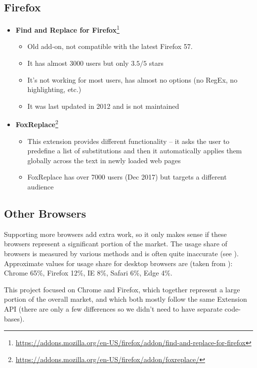 \documentclass[bsc,frontabs,twoside,singlespacing,parskip,deptreport]{infthesis}
\providecommand{\tightlist}{%
  \setlength{\itemsep}{0pt}\setlength{\parskip}{0pt}}
\begin{document}
\subsection{Firefox}

\begin{itemize}
\item
  \textbf{Find and Replace for Firefox}\footnote{\href{https://addons.mozilla.org/en-US/firefox/addon/find-and-replace-for-firefox}{https://addons.mozilla.org/en-US/firefox/addon/find-and-replace-for-firefox}}
  \begin{itemize}
  \tightlist
\item
  Old add-on, not compatible with the latest Firefox 57.
\item
  It has almost 3000 users but only $3.5/5$ stars
\item
  It's not working for most users, has almost no options (no RegEx, no highlighting, etc.)
\item
  It was last updated in 2012 and is not maintained
  \end{itemize}
\item
  \textbf{FoxReplace}\footnote{\href{https://addons.mozilla.org/en-US/firefox/addon/foxreplace/}{https://addons.mozilla.org/en-US/firefox/addon/foxreplace/}}
  \begin{itemize}
  \tightlist
\item
  This extension provides different functionality -- it asks the user to predefine a list of substitutions and then it automatically applies them globally across the text in newly loaded web pages
\item
  FoxReplace has over 7000 users (Dec 2017) but targets a different audience
  \end{itemize}
\end{itemize}

\subsection{Other Browsers}
Supporting more browsers add extra work, so it only makes sense if these browsers represent a significant portion of the market. The usage share of browsers is measured by various methods and is often quite inaccurate (see \cite{W1}). Approximate values for usage share for desktop browsers are (taken from \cite{A1}): Chrome 65\%, Firefox 12\%, IE 8\%, Safari 6\%, Edge 4\%.

This project focused on Chrome and Firefox, which together represent a large portion of the overall market, and which both mostly follow the same Extension API (there are only a few differences \cite{M5} so we didn't need to have separate code-bases).
\end{document}
